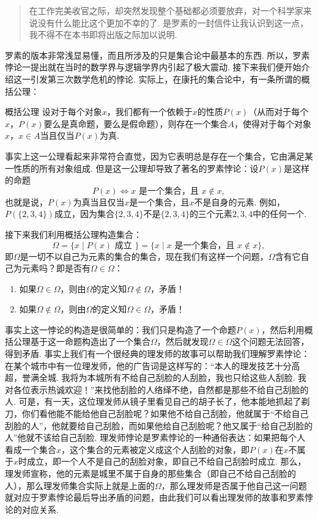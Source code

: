 \begin{quote}
    \kaishu
    在工作完美收官之际，却突然发现整个基础都必须要放弃，对一个科学家来说没有什么能比这个更加不幸的了. 是罗素的一封信件让我认识到这一点，我不得不在本书即将出版之际加以说明.
\end{quote}

罗素的版本非常浅显易懂，而且所涉及的只是集合论中最基本的东西. 所以，罗素悖论一提出就在当时的数学界与逻辑学界内引起了极大震动. 接下来我们便开始介绍这一引发第三次数学危机的悖论. 实际上，在康托的集合论中，有一条所谓的概括公理：

\begin{axiom}{概括公理}{}
    设对于每个对象$x$，我们都有一个依赖于$x$的性质$P(x)$（从而对于每个$x$，$P(x)$要么是真命题，要么是假命题），则存在一个集合$A$，使得对于每个对象$x$，$x\in A$当且仅当$P(x)$为真.
\end{axiom}

事实上这一公理看起来非常符合直觉，因为它表明总是存在一个集合，它由满足某一性质的所有对象组成. 但是这一公理却导致了著名的罗素悖论：设$P(x)$是这样的命题
\[P(x)\iff x\text{~是一个集合，且~}x\notin x,\]
也就是说，$P(x)$为真当且仅当$x$是一个集合，且$x$不是自身的元素. 例如，$P(\{2,3,4\})$成立，因为集合$\{2,3,4\}$不是$\{2,3,4\}$的三个元素$2,3,4$中的任何一个.

接下来我们利用概括公理构造集合：
\[\Omega=\{x\mid P(x)\text{~成立~}\}=\{x\mid x\text{~是一个集合，且~}x\notin x\},\]
即$\Omega$是一切不以自己为元素的集合的集合，现在我们有这样一个问题，$\Omega$含有它自己为元素吗？即是否有$\Omega\in\Omega$：
\begin{enumerate}
    \item 如果$\Omega\in \Omega$，则由$\Omega$的定义知$\Omega\notin \Omega$，矛盾！

    \item 如果$\Omega\notin \Omega$，则由$\Omega$的定义知$\Omega\in \Omega$，矛盾！
\end{enumerate}

事实上这一悖论的构造是很简单的：我们只是构造了一个命题$P(x)$，然后利用概括公理基于这一命题构造出了一个集合$\Omega$，然后就发现$\Omega\in\Omega$这个问题无法回答，得到矛盾. 事实上我们有一个很经典的理发师的故事可以帮助我们理解罗素悖论：在某个城市中有一位理发师，他的广告词是这样写的：``本人的理发技艺十分高超，誉满全城. 我将为本城所有不给自己刮脸的人刮脸，我也只给这些人刮脸. 我对各位表示热诚欢迎！''来找他刮脸的人络绎不绝，自然都是那些不给自己刮脸的人. 可是，有一天，这位理发师从镜子里看见自己的胡子长了，他本能地抓起了剃刀，你们看他能不能给他自己刮脸呢？如果他不给自己刮脸，他就属于``不给自己刮脸的人''，他就要给自己刮脸，而如果他给自己刮脸呢？他又属于``给自己刮脸的人''他就不该给自己刮脸. 理发师悖论是罗素悖论的一种通俗表达：如果把每个人看成一个集合$x$，这个集合的元素被定义成这个人刮脸的对象，即$P(x)$在$x$不属于$x$时成立，即一个人不是自己的刮脸对象，即自己不给自己刮脸时成立. 那么，理发师宣称，他的元素是城里不属于自身的那些集合（即自己不给自己刮脸的人），那么理发师集合实际上就是上面的$\Omega$，那么理发师是否属于他自己这一问题就对应于罗素悖论最后导出矛盾的问题，由此我们可以看出理发师的故事和罗素悖论的对应关系.

